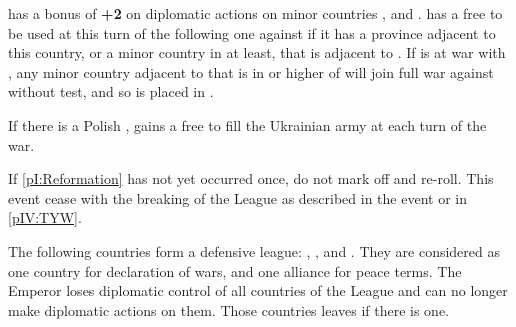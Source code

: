 


\phdipl
\aparag \TUR has a bonus of {\bf +2} on diplomatic actions on minor countries
\paysMoldavie, \paysValachie and \paysTransylvanie.
\aparag \TUR has a free \CB to be used at this turn of the following one
against \POL if it has a province adjacent to this country, or a minor country
in \AM at least, that is adjacent to \POL.
\aparag If \TUR is at war with \POL, any minor country adjacent to \POL that
is in \AM or higher of \TUR will join full war against \POL without test, and
so is placed in \EG.

\phadm
\aparag If there is a Polish \paysUkraine, \POL gains a free \ARMY\facemoins
to fill the Ukrainian army at each turn of the war.










\condition{}
\aparag If \ref{pI:Reformation} has not yet occurred once, do not mark off and
re-roll.
\aparag This event cease with the breaking of the League as described in the
event or in \ref{pIV:TYW}.

\phevnt
\aparag The following countries form a defensive league: \paysHesse,
\paysSaxe, \paysThuringe and \paysWurtemberg. They are considered as one
country for declaration of wars, and one alliance for peace terms.
\aparag The Emperor loses diplomatic control of all countries of the League
and can no longer make diplomatic actions on them. Those countries leaves \GE
if there is one.

